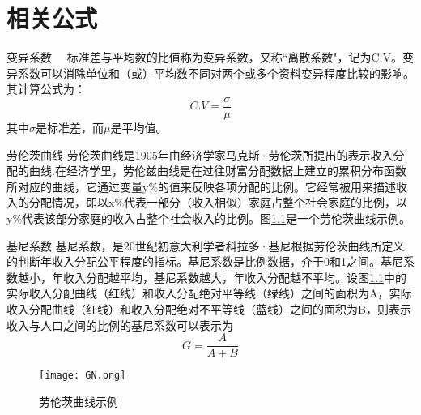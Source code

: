 
\chapter{相关公式}
\begin{section}{变异系数}
　标准差与平均数的比值称为变异系数，又称“离散系数"，记为C.V。变异系数可以消除单位和（或）平均数不同对两个或多个资料变异程度比较的影响。其计算公式为：
\begin{equation}
    C.V = \frac{\sigma }{\mu }
\end{equation}
其中$\sigma$是标准差，而$\mu$是平均值。
\end{section}


\begin{section}{劳伦茨曲线}
劳伦茨曲线是1905年由经济学家马克斯·劳伦茨所提出的表示收入分配的曲线.在经济学里，劳伦兹曲线是在过往财富分配数据上建立的累积分布函数所对应的曲线，它通过变量y\%的值来反映各项分配的比例。它经常被用来描述收入的分配情况，即以x\%代表一部分（收入相似）家庭占整个社会家庭的比例，以y\%代表该部分家庭的收入占整个社会收入的比例。图\ref{Fig:GN}是一个劳伦茨曲线示例。
\end{section}


\begin{section}{基尼系数}
基尼系数，是20世纪初意大利学者科拉多·基尼根据劳伦茨曲线所定义的判断年收入分配公平程度的指标。基尼系数是比例数据，介于0和1之间。基尼系数越小，年收入分配越平均，基尼系数越大，年收入分配越不平均。设图\ref{Fig:GN}中的实际收入分配曲线（红线）和收入分配绝对平等线（绿线）之间的面积为A，实际收入分配曲线（红线）和收入分配绝对不平等线（蓝线）之间的面积为B，则表示收入与人口之间的比例的基尼系数可以表示为
\begin{equation}
    G = \frac{A }{A+B }
\end{equation}

\end{section}

\begin{figure}[H]
	\centering
	\texttt{[image: GN.png]}
	\caption{劳伦茨曲线示例}
	\label{Fig:GN}
\end{figure}
